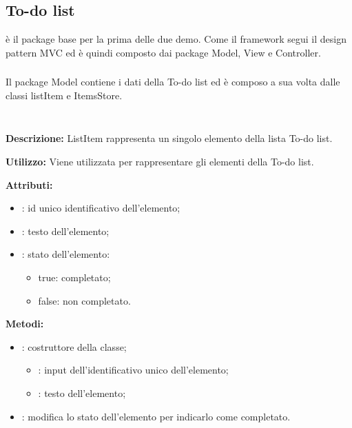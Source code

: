 \subsection{To-do list} \label{To-do list}
 è il package base per la prima delle due demo. Come il framework segui il design pattern MVC ed è quindi composto dai package Model, View e Controller.

\subsubsection[::Model]{\class} \label{\class}
Il package Model contiene i dati della To-do list ed è composo a sua volta dalle classi listItem e ItemsStore.


\subparagraph[::listItem]{\class}\mbox{}\\ \label{\class}
\textbf{Descrizione:}
ListItem rappresenta un singolo elemento della lista To-do list.

\textbf{Utilizzo:}
Viene utilizzata per rappresentare gli elementi della To-do list.

\textbf{Attributi:}
\begin{itemize}
	\item {}: id unico identificativo dell'elemento;
	\item {}: testo dell'elemento;
	\item {}: stato dell'elemento: 
	\begin{itemize}
		\item true: completato;
		\item false: non completato.
	\end{itemize}
\end{itemize}

\textbf{Metodi:}
\begin{itemize}
	\item {}: costruttore della classe;
	\begin{itemize}
		\item {}: input dell'identificativo unico dell'elemento;
		\item {}: testo dell'elemento;
	\end{itemize}
	\item {}: modifica lo stato dell'elemento per indicarlo come completato.
\end{itemize}

